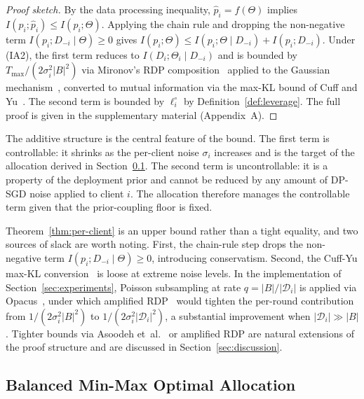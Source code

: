 \documentclass[letterpaper,journal]{IEEEtran}
\begin{document}
\begin{proof}[Proof sketch]
By the data processing inequality, $\hat{p}_i = f(\Theta)$ implies
$I(p_i;\hat{p}_i) \leq I(p_i;\Theta)$. Applying the chain rule and
dropping the non-negative term $I(p_i; D_{-i} \mid \Theta) \geq 0$
gives $I(p_i;\Theta) \leq I(p_i;\Theta \mid D_{-i}) +
I(p_i;D_{-i})$. Under (IA2), the first term reduces to
$I(D_i;\Theta_i \mid D_{-i})$ and is bounded by $T_{\max}/(2\sigma_i^2
|B|^2)$ via Mironov's RDP composition~\cite{mironov2017rdp} applied
to the Gaussian mechanism~\cite{abadi2016dpsgd}, converted to mutual
information via the max-KL bound of Cuff and Yu~\cite{cuff2016mi}.
The second term is bounded by $\ell_i^\circ$ by
Definition~\ref{def:leverage}. The full proof is given in the
supplementary material (Appendix~A).
\end{proof}

The additive structure is the central feature of the bound. The
first term is controllable: it shrinks as the per-client noise
$\sigma_i$ increases and is the target of the allocation derived in
Section~\ref{sec:defense-thm2}. The second term is uncontrollable:
it is a property of the deployment prior and cannot be reduced by
any amount of DP-SGD noise applied to client $i$. The allocation
therefore manages the controllable term given that the
prior-coupling floor is fixed.

Theorem~\ref{thm:per-client} is an upper bound rather than a tight
equality, and two sources of slack are worth noting. First, the
chain-rule step drops the non-negative term $I(p_i; D_{-i} \mid
\Theta) \geq 0$, introducing conservatism. Second, the Cuff-Yu
max-KL conversion~\cite{cuff2016mi} is loose at extreme noise
levels. In the implementation of Section~\ref{sec:experiments},
Poisson subsampling at rate $q = |B|/|\mathcal{D}_i|$ is applied
via Opacus~\cite{yousefpour2021opacus}, under which amplified
RDP~\cite{wang2019subsampled} would tighten the per-round
contribution from $1/(2\sigma_i^2|B|^2)$ to
$1/(2\sigma_i^2|\mathcal{D}_i|^2)$, a substantial improvement when
$|\mathcal{D}_i| \gg |B|$. Tighter bounds via Asoodeh
et~al.~\cite{asoodeh2021variants} or amplified RDP are natural
extensions of the proof structure and are discussed in
Section~\ref{sec:discussion}.

\subsection{Balanced Min-Max Optimal Allocation}
\label{sec:defense-thm2}
\end{document}
